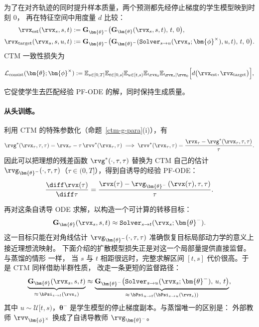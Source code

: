 为了在对齐轨迹的同时提升样本质量，两个预测都先经停止梯度的学生模型映到时刻 $0$，
再在特征空间中用度量 $d$ 比较：
\begin{align*}
\rvx_{\mathrm{est}}(\rvx_s,s,t) &:= \mathbf{G}_{\bm{\theta}^-} \big(\mathbf{G}_{\bm{\theta}}(\rvx_s,s,t),\, t,\, 0\big),\\
\rvx_{\mathrm{target}}(\rvx_s,s,u,t) &:= \mathbf{G}_{\bm{\theta}^-} \big(
\mathbf{G}_{\bm{\theta}^-}(\mathtt{Solver}_{s\to u}(\rvx_s;\bm{\phi}^\times), u, t),\, t,\, 0\big).
\end{align*}
CTM 一致性损失为
\begin{mdframed}
    \begin{align}\label{eq:ctm-consist-distill}
\begin{aligned}
\mathcal{L}_{\mathrm{consist}}(\bm{\theta}; \bm{\phi}^\times)
:=
\mathbb{E}_{s \in [0,T]}\mathbb{E}_{t \in [0,s]}\mathbb{E}_{u \in [t,s)}
\mathbb{E}_{\rvx_0}\mathbb{E}_{\rvx_s |\rvx_0}
\Big[ d\big(\rvx_{\mathrm{est}}, \rvx_{\mathrm{target}}\big) \Big],
\end{aligned}
\end{align}
\end{mdframed}
它促使学生去匹配经验 PF-ODE 的解，同时保持生成质量。


\paragraph{从头训练。}
利用 CTM 的特殊参数化（命题~\ref{ctm-g-para}(i)），有
\[
\rvg^*(\rvx_\tau, \tau, \tau)
= \rvx_\tau - \tau\,\rvv^*(\rvx_\tau,\tau)
 \implies
\rvv^*(\rvx_\tau,\tau)
= \frac{\rvx_\tau - \rvg^*(\rvx_\tau, \tau, \tau)}{\tau}.
\]
因此可以把理想的残差函数
$\rvg^*(\cdot,\tau,\tau)$ 替换为 CTM 自己的估计
$\rvg_{\bm{\theta}^-}(\cdot,\tau,\tau)$（$\tau \in (0,T]$），得到自诱导的经验 PF-ODE：
\begin{align}\label{eq:emp-pf-ode-ctm}
\frac{\diff \rvx(\tau)}{\diff \tau}
= \frac{\rvx(\tau) - \rvg_{\bm{\theta}^-} \left(\rvx(\tau),\tau,\tau\right)}{\tau}.
\end{align}

再对这条自诱导 ODE 求解，以构造一个可计算的转移目标：
\[
\mathbf{G}_{\bm{\theta}}(\rvx_s, s, t)
\approx \mathtt{Solver}_{s\to t}(\rvx_s;\bm{\theta}^-).
\]
这一目标只能在对角线估计 $\rvg_{\bm{\theta}^-}(\cdot,\tau,\tau)$ 准确恢复目标局部动力学的意义上接近理想流映射。
下面介绍的扩散模型损失正是对这一个局部量提供直接监督。与蒸馏的情形  一样，
当 $s$ 与 $t$ 相距很远时，完整求解区间 $[t,s]$ 代价很高。于是 CTM 同样借助半群性质，
改走一条更短的监督路径：
\[
\underbrace{\mathbf{G}_{\bm{\theta}}(\rvx_s, s, t)}_{\approx\, \bPsi_{s\to t}(\rvx_s)}
 \approx
\underbrace{\mathbf{G}_{\bm{\theta}^-} \big(\mathtt{Solver}_{s\to u}(\rvx_s;\bm{\theta}^-),\, u,\, t\big)}_{\approx\, \bPsi_{u\to t}(\bPsi_{s\to u}(\rvx_s))},
\]
其中 $u \sim \mathcal{U}[t,s)$，$\bm{\theta}^-$ 是学生模型的停止梯度副本。与蒸馏唯一的区别是：
外部教师 $\rvv_{\bm{\phi}^\times}$ 换成了自诱导教师 $\rvg_{\bm{\theta}^-}$。

